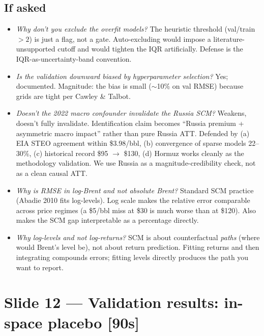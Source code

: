 \documentclass[11pt,a4paper]{article}
\newcommand{\timetag}[1]{\hfill\textcolor{muted}{\small[#1]}}
\begin{document}
\subsection{If asked}
\begin{itemize}
  \item \textit{Why don't you exclude the overfit models?} The heuristic threshold (val/train $>2$) is just a flag, not a gate. Auto-excluding would impose a literature-unsupported cutoff and would tighten the IQR artificially. Defense is the IQR-as-uncertainty-band convention.
  \item \textit{Is the validation downward biased by hyperparameter selection?} Yes; documented. Magnitude: the bias is small ($\sim$10\% on val RMSE) because grids are tight per Cawley \& Talbot.
  \item \textit{Doesn't the 2022 macro confounder invalidate the Russia SCM?} Weakens, doesn't fully invalidate. Identification claim becomes ``Russia premium + asymmetric macro impact'' rather than pure Russia ATT. Defended by (a) EIA STEO agreement within \$3.98/bbl, (b) convergence of sparse models 22--30\%, (c) historical record \$95 $\to$ \$130, (d) Hormuz works cleanly as the methodology validation. We use Russia as a magnitude-credibility check, not as a clean causal ATT.
  \item \textit{Why is RMSE in log-Brent and not absolute Brent?} Standard SCM practice (Abadie 2010 fits log-levels). Log scale makes the relative error comparable across price regimes (a \$5/bbl miss at \$30 is much worse than at \$120). Also makes the SCM gap interpretable as a percentage directly.
  \item \textit{Why log-levels and not log-returns?} SCM is about counterfactual \emph{paths} (where would Brent's level be), not about return prediction. Fitting returns and then integrating compounds errors; fitting levels directly produces the path you want to report.
\end{itemize}

\section{Slide 12 --- Validation results: in-space placebo \timetag{90s}}
\end{document}
